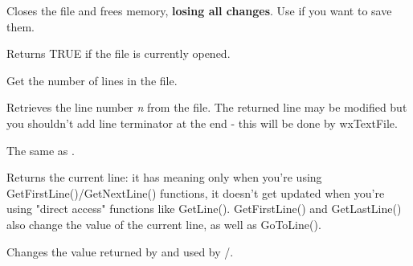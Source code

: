 \label{wxtextfileclose}


Closes the file and frees memory, {\bf losing all changes}. Use  
if you want to save them.

\label{wxtextfileisopened}


Returns TRUE if the file is currently opened.

\label{wxtextfilegetlinecount}


Get the number of lines in the file.

\label{wxtextfilegetline}


Retrieves the line number {\it n} from the file. The returned line may be
modified but you shouldn't add line terminator at the end - this will be done
by wxTextFile.

\label{wxtextfileoperatorarray}


The same as .

\label{wxtextfilegetcurrentline}


Returns the current line: it has meaning only when you're using
GetFirstLine()/GetNextLine() functions, it doesn't get updated when
you're using "direct access" functions like GetLine(). GetFirstLine() and
GetLastLine() also change the value of the current line, as well as
GoToLine().

\label{wxtextfilegotoline}


Changes the value returned by  
and used by /.

\label{wxtextfileeof}

